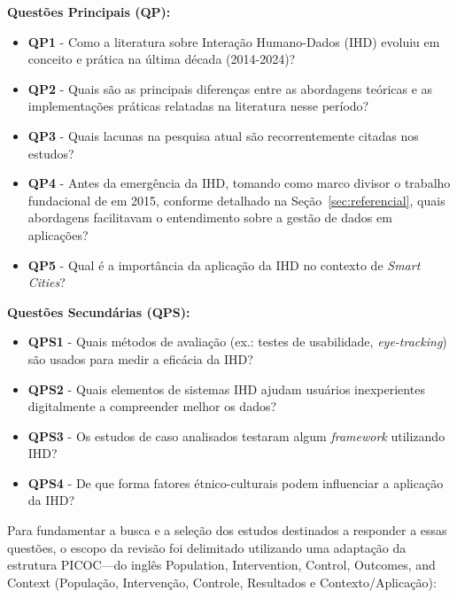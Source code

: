 \documentclass[12pt]{article}
\begin{document}
\textbf{Questões Principais (QP):}
\begin{itemize}
\item \textbf{QP1} - Como a literatura sobre Interação Humano-Dados (IHD) evoluiu em conceito e prática na última década (2014-2024)?
\item \textbf{QP2} - Quais são as principais diferenças entre as abordagens teóricas e as implementações práticas relatadas na literatura nesse período?
\item \textbf{QP3} - Quais lacunas na pesquisa atual são recorrentemente citadas nos estudos?
\item \textbf{QP4} - Antes da emergência da IHD, tomando como marco divisor o trabalho fundacional de \cite{mortier2015humandatainteractionhumanface} em 2015, conforme detalhado na Seção~\ref{sec:referencial}, quais abordagens facilitavam o entendimento sobre a gestão de dados em aplicações?
\item \textbf{QP5} - Qual é a importância da aplicação da IHD no contexto de \textit{Smart Cities}?
\end{itemize}

\textbf{Questões Secundárias (QPS):}
\begin{itemize}
\item \textbf{QPS1} - Quais métodos de avaliação (ex.: testes de usabilidade, \textit{eye-tracking}) são usados para medir a eficácia da IHD?
\item \textbf{QPS2} - Quais elementos de sistemas IHD ajudam usuários inexperientes digitalmente a compreender melhor os dados?
\item \textbf{QPS3} - Os estudos de caso analisados testaram algum \textit{framework} utilizando IHD?
\item \textbf{QPS4} - De que forma fatores étnico-culturais podem influenciar a aplicação da IHD?
\end{itemize}

Para fundamentar a busca e a seleção dos estudos destinados a responder a essas questões, o escopo da revisão foi delimitado utilizando uma adaptação da estrutura PICOC---do inglês Population, Intervention, Control, Outcomes, and Context (População, Intervenção, Controle, Resultados e Contexto/Aplicação):
\end{document}
